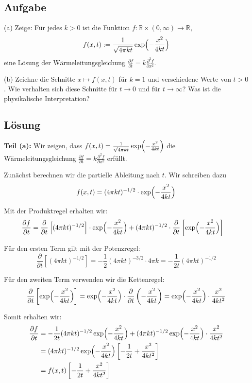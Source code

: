 \documentclass{article}
\begin{document}
\subsection*{Aufgabe}
(a) Zeige: Für jedes $k>0$ ist die Funktion $f:\mathbb{R}\times(0,\infty)\to\mathbb{R}$,
$$
   f(x,t) := \frac{1}{\sqrt{4\pi k t}}\exp\Bigl(-\frac{x^2}{4kt}\Bigr)
$$
eine Lösung der Wärmeleitungsgleichung $\frac{\partial f}{\partial t}=k\frac{\partial^2f}{\partial x^2}$.

(b) Zeichne die Schnitte $x\mapsto f(x,t)$ für $k=1$ und
verschiedene Werte von $t>0$. Wie verhalten sich diese Schnitte
für $t\to 0$ und für $t\to\infty$? Was ist die physikalische
Interpretation?

\subsection*{Lösung}

\textbf{Teil (a):} Wir zeigen, dass $f(x,t) = \frac{1}{\sqrt{4\pi k t}}\exp\Bigl(-\frac{x^2}{4kt}\Bigr)$ die Wärmeleitungsgleichung $\frac{\partial f}{\partial t} = k\frac{\partial^2 f}{\partial x^2}$ erfüllt.

Zunächst berechnen wir die partielle Ableitung nach $t$. Wir schreiben dazu
$$f(x,t) = (4\pi k t)^{-1/2} \cdot \exp\Bigl(-\frac{x^2}{4kt}\Bigr)$$

Mit der Produktregel erhalten wir:
\begin{align}
\frac{\partial f}{\partial t} &= \frac{\partial}{\partial t}\left[(4\pi k t)^{-1/2}\right] \cdot \exp\Bigl(-\frac{x^2}{4kt}\Bigr) + (4\pi k t)^{-1/2} \cdot \frac{\partial}{\partial t}\left[\exp\Bigl(-\frac{x^2}{4kt}\Bigr)\right]
\end{align}

Für den ersten Term gilt mit der Potenzregel:
$$\frac{\partial}{\partial t}\left[(4\pi k t)^{-1/2}\right] = -\frac{1}{2}(4\pi k t)^{-3/2} \cdot 4\pi k = -\frac{1}{2t}(4\pi k t)^{-1/2}$$

Für den zweiten Term verwenden wir die Kettenregel:
$$\frac{\partial}{\partial t}\left[\exp\Bigl(-\frac{x^2}{4kt}\Bigr)\right] = \exp\Bigl(-\frac{x^2}{4kt}\Bigr) \cdot \frac{\partial}{\partial t}\left(-\frac{x^2}{4kt}\right) = \exp\Bigl(-\frac{x^2}{4kt}\Bigr) \cdot \frac{x^2}{4kt^2}$$

Somit erhalten wir:
\begin{align}
\frac{\partial f}{\partial t} &= -\frac{1}{2t}(4\pi k t)^{-1/2} \exp\Bigl(-\frac{x^2}{4kt}\Bigr) + (4\pi k t)^{-1/2} \exp\Bigl(-\frac{x^2}{4kt}\Bigr) \cdot \frac{x^2}{4kt^2}\\
&= (4\pi k t)^{-1/2} \exp\Bigl(-\frac{x^2}{4kt}\Bigr) \left[-\frac{1}{2t} + \frac{x^2}{4kt^2}\right]\\
&= f(x,t) \left[-\frac{1}{2t} + \frac{x^2}{4kt^2}\right]
\end{align}
\end{document}
